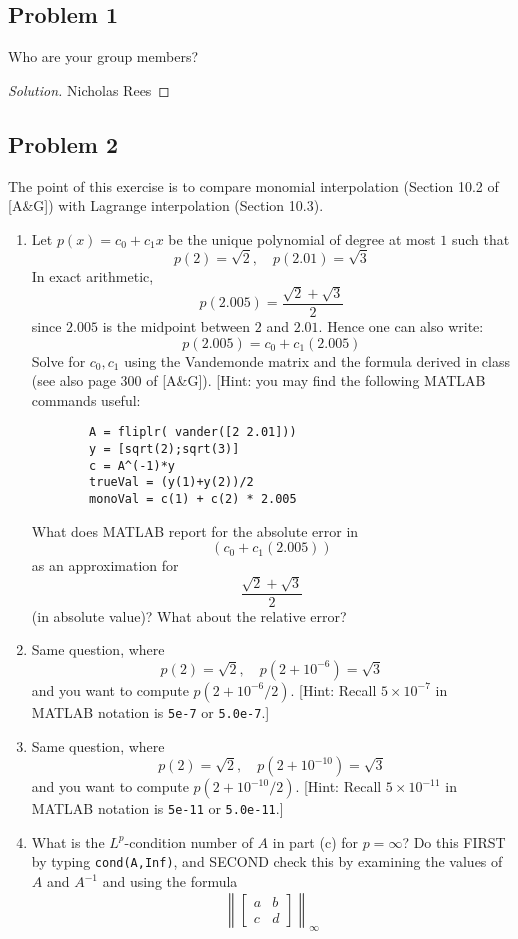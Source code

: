 \documentclass{article}
\begin{document}
\subsection*{Problem 1}
Who are your group members?
\begin{proof}[Solution]\let\qed\relax
	Nicholas Rees
\end{proof}


\subsection*{Problem 2}
The point of this exercise is to compare monomial interpolation
(Section 10.2 of [A\&G]) with Lagrange interpolation (Section 10.3).
\begin{enumerate}
	\item Let $p(x) = c_0 + c_1x$ be the unique polynomial of degree at most $1$ such that
		\[
			p(2) = \sqrt{2}, \quad p(2.01) = \sqrt{3}
		\]
		In exact arithmetic,
		\[
			p(2.005) = \frac{\sqrt{2} + \sqrt{3}}{2}
		\]
		since $2.005$ is the midpoint between $2$ and $2.01$.
		Hence one can also write:
		\[
			p(2.005) = c_0 + c_1(2.005)
		\]
		Solve for $c_0,c_1$ using the Vandemonde matrix and the formula derived in class
		(see also page 300 of [A\&G]).
		[Hint: you may find the following MATLAB commands useful:
		\begin{verbatim}
		A = fliplr( vander([2 2.01]))
		y = [sqrt(2);sqrt(3)]
		c = A^(-1)*y
		trueVal = (y(1)+y(2))/2
		monoVal = c(1) + c(2) * 2.005
		\end{verbatim}
		What does MATLAB report for the absolute error in
		\[
			(c_0 + c_1(2.005))
		\]
		as an approximation for
		\[
			\frac{\sqrt{2} + \sqrt{3}}{2}
		\]
		(in absolute value)? What about the relative error?
	\item Same question, where
		\[
			p(2) = \sqrt{2}, \quad p(2 + 10^{-6}) = \sqrt{3}
		\]
		and you want to compute $p(2 + 10^{-6}/2)$.
		[Hint: Recall $5 \times 10^{-7}$ in MATLAB notation is \verb|5e-7| or \verb|5.0e-7|.]
	\item Same question, where
		\[
			p(2) = \sqrt{2}, \quad p(2 + 10^{-10}) = \sqrt{3}
		\]
		and you want to compute $p(2 + 10^{-10}/2)$.
		[Hint: Recall $5 \times 10^{-11}$ in MATLAB notation is \verb|5e-11| or \verb|5.0e-11|.]
	\item What is the $L^p$-condition number of $A$ in part (c) for $p = \infty$?
		Do this FIRST by typing \verb|cond(A,Inf)|,
		and SECOND check this by examining the values of $A$ and $A^{-1}$ and using the formula
		\[
			\left\lVert \begin{bmatrix} a & b \\ c & d \end{bmatrix} \right\rVert_\infty
\]
\end{enumerate}
\end{document}
